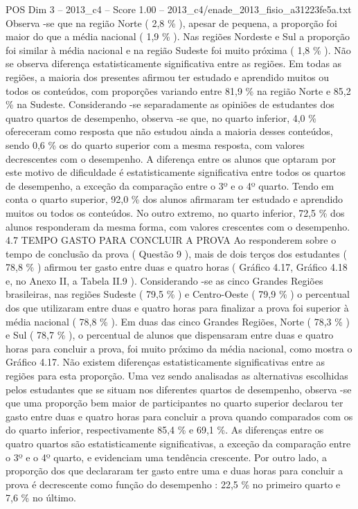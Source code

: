 \begin{textsample}{POS Dim 3 – 2013\_c4 – Score 1.00 – 2013\_c4/enade\_2013\_fisio\_a31223fe5a.txt}
Observa -se que na região Norte ( 2,8 \% ), apesar de pequena, a proporção foi maior do que a média nacional ( 1,9 \% ).
Nas regiões Nordeste e Sul a proporção foi similar à média nacional e na região Sudeste foi muito próxima ( 1,8 \% ).
Não se observa diferença estatisticamente significativa entre as regiões.
Em todas as regiões, a maioria dos presentes afirmou ter estudado e aprendido muitos ou todos os conteúdos, com proporções variando entre 81,9 \% na região Norte e 85,2 \% na Sudeste.
Considerando -se separadamente as opiniões de estudantes dos quatro quartos de desempenho, observa -se que, no quarto inferior, 4,0 \% ofereceram como resposta que não estudou ainda a maioria desses conteúdos, sendo 0,6 \% os do quarto superior com a mesma resposta, com valores decrescentes com o desempenho.
A diferença entre os alunos que optaram por este motivo de dificuldade é estatisticamente significativa entre todos os quartos de desempenho, a exceção da comparação entre o 3º e o 4º quarto.
Tendo em conta o quarto superior, 92,0 \% dos alunos afirmaram ter estudado e aprendido muitos ou todos os conteúdos.
No outro extremo, no quarto inferior, 72,5 \% dos alunos responderam da mesma forma, com valores crescentes com o desempenho. 4.7 TEMPO GASTO PARA CONCLUIR A PROVA Ao responderem sobre o tempo de conclusão da prova ( Questão 9 ), mais de dois terços dos estudantes ( 78,8 \% ) afirmou ter gasto entre duas e quatro horas ( Gráfico 4.17, Gráfico 4.18 e, no Anexo II, a Tabela II.9 ).
Considerando -se as cinco Grandes Regiões brasileiras, nas regiões Sudeste ( 79,5 \% ) e Centro-Oeste ( 79,9 \% ) o percentual dos que utilizaram entre duas e quatro horas para finalizar a prova foi superior à média nacional ( 78,8 \% ).
Em duas das cinco Grandes Regiões, Norte ( 78,3 \% ) e Sul ( 78,7 \% ), o percentual de alunos que dispensaram entre duas e quatro horas para concluir a prova, foi muito próximo da média nacional, como mostra o Gráfico 4.17.
Não existem diferenças estatisticamente significativas entre as regiões para esta proporção.
Uma vez sendo analisadas as alternativas escolhidas pelos estudantes que se situam nos diferentes quartos de desempenho, observa -se que uma proporção bem maior de participantes no quarto superior declarou ter gasto entre duas e quatro horas para concluir a prova quando comparados com os do quarto inferior, respectivamente 85,4 \% e 69,1 \%.
As diferenças entre os quatro quartos são estatisticamente significativas, a exceção da comparação entre o 3º e o 4º quarto, e evidenciam uma tendência crescente.
Por outro lado, a proporção dos que declararam ter gasto entre uma e duas horas para concluir a prova é decrescente como função do desempenho : 22,5 \% no primeiro quarto e 7,6 \% no último.

\end{textsample}
